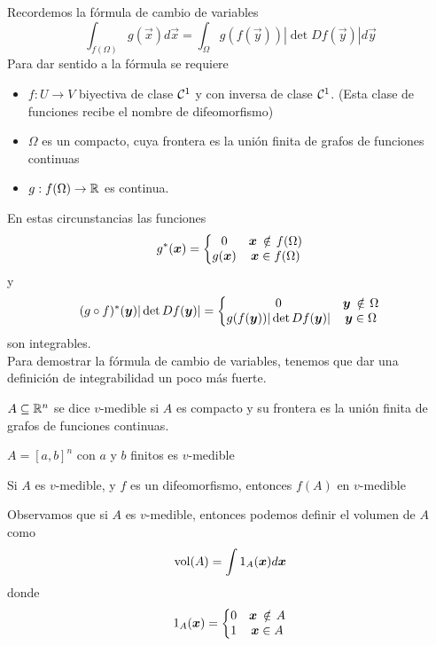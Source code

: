 Recordemos la f\'ormula de cambio de variables
\[\int_{f(\Omega)}g(\vec{x})d\vec{x}=\int_{\Omega}g(f(\vec{y}))|\det Df(\vec{y})|d\vec{y}\]
Para dar sentido a la f\'ormula se requiere
\begin{itemize}
\item $f:U\to V$ biyectiva de clase $\cl$ y con inversa de clase
$\cl$. (Esta clase de funciones recibe el nombre de difeomorfismo)
\item $\Omega$ es un compacto, cuya frontera es la uni\'on finita
de grafos de funciones continuas
\item $g:f(\Omega)\to \R$ es continua.
\end{itemize}
En estas circunstancias las funciones
\[g^*(\vec{x})=\left\{\begin{matrix} 0 & \vec{x}\nin f(\Omega) \cr g(\vec{x}) & \vec{x}\in
f(\Omega) \cr\end{matrix}\right.\] y
\[(g\circ f)^*(\vec{y})|\det Df(\vec{y})|=\left\{\begin{matrix}0 & \vec{y} \nin \Omega \cr
g(f(\vec{y}))|\det Df(\vec{y})| & \vec{y} \in \Omega\cr \end{matrix}\right.\] son
integrables.\\ Para demostrar la f\'ormula de cambio de variables,
tenemos que dar una definici\'on de integrabilidad un poco
m\'as fuerte.

\begin{definicion} $A\subseteq\R^n$ se dice $v$-medible si
$A$ es compacto y su frontera es la uni\'on finita de grafos de
funciones continuas.
\end{definicion}

\begin{ejemplo}
$A=[a,b]^n$ con $a$ y $b$ finitos es $v$-medible
\end{ejemplo}

\begin{ejemplo}
Si $A$ es $v$-medible, y $f$ es un difeomorfismo,
entonces $f(A)$ en $v$-medible 
\end{ejemplo} 

Observamos que si $A$ es $v$-medible, entonces podemos definir el volumen de $A$ como
\[{\rm {\rm vol}} (A)=\int 1_A(\vec{x})d\vec{x}\]
donde
\[1_A(\vec{x})=\left\{\begin{matrix}0 & \vec{x}\nin A \cr 1 & \vec{x}\in A\cr\end{matrix}\right.\]

